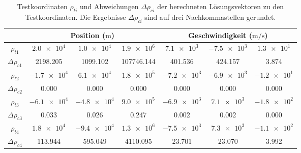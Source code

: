 \documentclass[a4paper,12pt]{article}
\numberwithin{equation}{section}
\begin{document}
\begin{table}[ht]
\renewcommand{\arraystretch}{1.1}
\centering
\begin{tabular}{|c|c|c|c|c|c|c|}
\cline{2-7}
\multicolumn{1}{c|}{} & \multicolumn{3}{c|}{Position ($\si{\meter}$)} & \multicolumn{3}{c|}{Geschwindigkeit ($\si{\meter\per\second}$)} \\
\cline{2-7}\hline
$\rho_{t1}$ & $\num{2.0e4}$ & $\num{1.0e4}$ & $\num{1.9e6}$ & $\num{7.1e3} $ & $\num{-7.5e3}$ & $\num{1.3e1}$ \\
$\Delta \rho_{c1}$ & 2198.205 & 1099.102 & 107746.144 & 401.536 & 424.157 & 3.874 \\
\hline
$\rho_{t2}$ & $\num{-1.7e4}$ & $\num{6.1e4}$ & $\num{1.8e5}$ & $\num{-7.2e3}$ & $\num{-6.9e3}$ & $\num{-1.2e1}$ \\
$\Delta \rho_{c2}$ & 0.000 & 0.000 & 0.000 & 0.000 & 0.000 & 0.000 \\
\hline
$\rho_{t3}$ & $\num{-6.1e4}$ & $\num{-4.8e4}$ & $\num{9.0e5}$ & $\num{-6.9e3}$ & $\num{7.1e3}$ & $\num{-1.8e2}$ \\
$\Delta \rho_{c3}$ & 0.033 & 0.026 & 0.247 & 0.002 & 0.002 & 0.000 \\
\hline
$\rho_{t4}$ & $\num{1.8e4}$ & $\num{-9.4e4}$ & $\num{1.3e6}$ & $\num{-7.5e3}$ & $\num{7.3e3}$ & $\num{-1.1e2}$ \\
$\Delta \rho_{c4}$ & 113.944 & 595.049 & 4110.095 & 23.701 & 23.070 & 3.992 \\
\hline
\end{tabular}
\caption{Testkoordinaten $\rho_{ti}$ und Abweichungen $\Delta \rho_{ci}$ der berechneten Lösungsvektoren zu den Testkoordinaten. Die Ergebnisse $\Delta \rho_{ci}$ sind auf drei Nachkommastellen gerundet.}
\label{tab:testconfig1}
\end{table}
\end{document}
